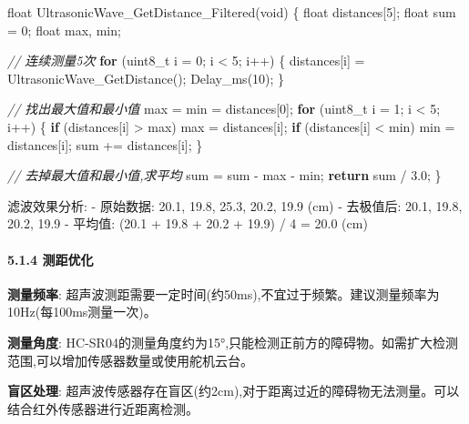 \documentclass[
]{article}
\newenvironment{Shaded}{}{}
\newcommand{\CommentTok}[1]{\textcolor[rgb]{0.38,0.63,0.69}{\textit{#1}}}
\newcommand{\ControlFlowTok}[1]{\textcolor[rgb]{0.00,0.44,0.13}{\textbf{#1}}}
\newcommand{\DataTypeTok}[1]{\textcolor[rgb]{0.56,0.13,0.00}{#1}}
\newcommand{\DecValTok}[1]{\textcolor[rgb]{0.25,0.63,0.44}{#1}}
\newcommand{\FloatTok}[1]{\textcolor[rgb]{0.25,0.63,0.44}{#1}}
\newcommand{\NormalTok}[1]{#1}
\begin{document}
\begin{Shaded}
\begin{Highlighting}[]
\DataTypeTok{float}\NormalTok{ UltrasonicWave\_GetDistance\_Filtered(}\DataTypeTok{void}\NormalTok{)}
\NormalTok{\{}
    \DataTypeTok{float}\NormalTok{ distances[}\DecValTok{5}\NormalTok{];}
    \DataTypeTok{float}\NormalTok{ sum = }\DecValTok{0}\NormalTok{;}
    \DataTypeTok{float}\NormalTok{ max, min;}
    
    \CommentTok{// 连续测量5次}
    \ControlFlowTok{for}\NormalTok{ (}\DataTypeTok{uint8\_t}\NormalTok{ i = }\DecValTok{0}\NormalTok{; i \textless{} }\DecValTok{5}\NormalTok{; i++) \{}
\NormalTok{        distances[i] = UltrasonicWave\_GetDistance();}
\NormalTok{        Delay\_ms(}\DecValTok{10}\NormalTok{);}
\NormalTok{    \}}
    
    \CommentTok{// 找出最大值和最小值}
\NormalTok{    max = min = distances[}\DecValTok{0}\NormalTok{];}
    \ControlFlowTok{for}\NormalTok{ (}\DataTypeTok{uint8\_t}\NormalTok{ i = }\DecValTok{1}\NormalTok{; i \textless{} }\DecValTok{5}\NormalTok{; i++) \{}
        \ControlFlowTok{if}\NormalTok{ (distances[i] \textgreater{} max) max = distances[i];}
        \ControlFlowTok{if}\NormalTok{ (distances[i] \textless{} min) min = distances[i];}
\NormalTok{        sum += distances[i];}
\NormalTok{    \}}
    
    \CommentTok{// 去掉最大值和最小值,求平均}
\NormalTok{    sum = sum {-} max {-} min;}
    \ControlFlowTok{return}\NormalTok{ sum / }\FloatTok{3.0}\NormalTok{;}
\NormalTok{\}}
\end{Highlighting}
\end{Shaded}

滤波效果分析: - 原始数据: 20.1, 19.8, 25.3, 20.2, 19.9 (cm) - 去极值后:
20.1, 19.8, 20.2, 19.9 - 平均值: (20.1 + 19.8 + 20.2 + 19.9) / 4 = 20.0
(cm)

\hypertarget{ux6d4bux8dddux4f18ux5316}{%
\paragraph{5.1.4 测距优化}\label{ux6d4bux8dddux4f18ux5316}}

\textbf{测量频率}:
超声波测距需要一定时间(约50ms),不宜过于频繁。建议测量频率为10Hz(每100ms测量一次)。

\textbf{测量角度}:
HC-SR04的测量角度约为15°,只能检测正前方的障碍物。如需扩大检测范围,可以增加传感器数量或使用舵机云台。

\textbf{盲区处理}:
超声波传感器存在盲区(约2cm),对于距离过近的障碍物无法测量。可以结合红外传感器进行近距离检测。
\end{document}
